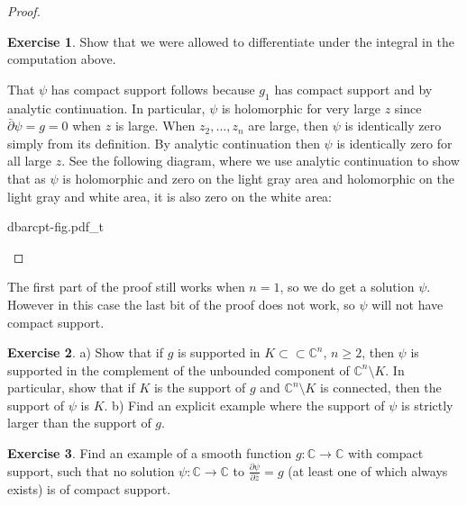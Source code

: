 \documentclass[12pt,openany]{book}
\newcommand{\C}{{\mathbb{C}}}
\theoremstyle{plain}
\theoremstyle{remark}
\theoremstyle{definition}
\newenvironment{exbox}{%
    \def\FrameCommand{\vrule width 1pt \relax\hspace {10pt}}%
    \MakeFramed {\advance \hsize -\width \FrameRestore }%
}{%
    \endMakeFramed
}
\theoremstyle{exercise}
\newtheorem{exercise}{Exercise}[section]
\theoremstyle{example}
\begin{document}
\begin{proof}
\begin{exbox}
\begin{exercise}
Show that we were allowed to differentiate under the integral in the
computation above.
\end{exercise}
\end{exbox}

That $\psi$ has compact support follows because $g_1$ has compact
support and by analytic continuation.  In particular, $\psi$ is
holomorphic for very large $z$ since $\bar{\partial} \psi = g = 0$ when $z$
is large.  When $z_2,\ldots,z_n$ are large, then $\psi$ is identically zero
simply from its definition.  By analytic continuation then $\psi$ is
identically zero for all large $z$.  See the following diagram, where we use
analytic continuation to show that as $\psi$ is holomorphic and zero on the
light gray area and holomorphic on the light gray and white area, it is also
zero on the white area:

\begin{center}
{dbarcpt-fig.pdf_t}
\end{center}
\end{proof}

The first part of the proof still works when $n=1$, so we do get a solution
$\psi$.  However in this case the last bit of the proof does not work, so
$\psi$ will not have compact support.

\begin{exbox}
\begin{exercise} \label{exercise:supportofpsi}
a) Show that if $g$ is supported in $K \subset \subset \C^n$, $n \geq 2$,
then $\psi$ is supported in the complement of the unbounded component
of $\C^n \setminus K$.  In particular, show that if $K$ is the support of
$g$ and $\C^n \setminus K$ is connected, then the support of
$\psi$ is $K$.
b) Find an explicit example where the support of $\psi$ is strictly larger
than the support of $g$.
\end{exercise}

\begin{exercise}
Find an example of a smooth function $g \colon \C \to \C$ with compact
support, such that no solution $\psi \colon \C \to \C$ to
$\frac{\partial \psi}{\partial \bar{z}} = g$ (at least one of which always exists) is
of compact support.
\end{exercise}
\end{exbox}

\end{document}
